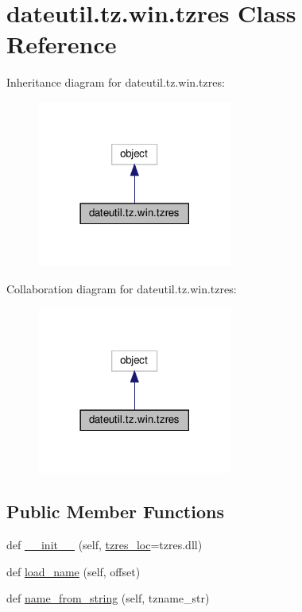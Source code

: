\hypertarget{classdateutil_1_1tz_1_1win_1_1tzres}{}\section{dateutil.\+tz.\+win.\+tzres Class Reference}
\label{classdateutil_1_1tz_1_1win_1_1tzres}


Inheritance diagram for dateutil.\+tz.\+win.\+tzres\+:
\nopagebreak
\begin{figure}[H]
\begin{center}
\leavevmode
\includegraphics[width=182pt]{classdateutil_1_1tz_1_1win_1_1tzres__inherit__graph}
\end{center}
\end{figure}


Collaboration diagram for dateutil.\+tz.\+win.\+tzres\+:
\nopagebreak
\begin{figure}[H]
\begin{center}
\leavevmode
\includegraphics[width=182pt]{classdateutil_1_1tz_1_1win_1_1tzres__coll__graph}
\end{center}
\end{figure}
\subsection*{Public Member Functions}
\begin{DoxyCompactItemize}
\item 
def \hyperlink{classdateutil_1_1tz_1_1win_1_1tzres_afde0ff2c11aa19b84bfd471a799dff33}{\+\_\+\+\_\+init\+\_\+\+\_\+} (self, \hyperlink{classdateutil_1_1tz_1_1win_1_1tzres_ac5f17128079cebb8d7851be15c667e0a}{tzres\+\_\+loc}=\textquotesingle{}tzres.\+dll\textquotesingle{})
\item 
def \hyperlink{classdateutil_1_1tz_1_1win_1_1tzres_ae0b251cf7df2f866b241b669577f0b3b}{load\+\_\+name} (self, offset)
\item 
def \hyperlink{classdateutil_1_1tz_1_1win_1_1tzres_ab740cc88e4c9c39bc0b4ce707a256ea0}{name\+\_\+from\+\_\+string} (self, tzname\+\_\+str)
\end{DoxyCompactItemize}
